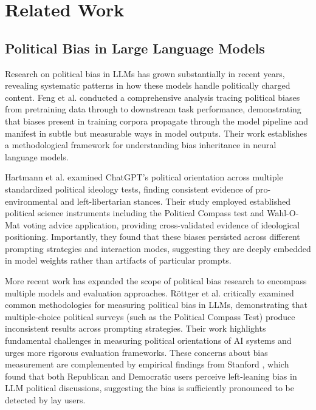 \documentclass[11pt,a4paper]{article}
\begin{document}
\section{Related Work}

\subsection{Political Bias in Large Language Models}

Research on political bias in LLMs has grown substantially in recent years, revealing systematic patterns in how these models handle politically charged content. Feng et al. \citep{feng2023pretraining} conducted a comprehensive analysis tracing political biases from pretraining data through to downstream task performance, demonstrating that biases present in training corpora propagate through the model pipeline and manifest in subtle but measurable ways in model outputs. Their work establishes a methodological framework for understanding bias inheritance in neural language models.

Hartmann et al. \citep{hartmann2023political} examined ChatGPT's political orientation across multiple standardized political ideology tests, finding consistent evidence of pro-environmental and left-libertarian stances. Their study employed established political science instruments including the Political Compass test and Wahl-O-Mat voting advice application, providing cross-validated evidence of ideological positioning. Importantly, they found that these biases persisted across different prompting strategies and interaction modes, suggesting they are deeply embedded in model weights rather than artifacts of particular prompts.

More recent work has expanded the scope of political bias research to encompass multiple models and evaluation approaches. Röttger et al. \citep{rottger2024political} critically examined common methodologies for measuring political bias in LLMs, demonstrating that multiple-choice political surveys (such as the Political Compass Test) produce inconsistent results across prompting strategies. Their work highlights fundamental challenges in measuring political orientations of AI systems and urges more rigorous evaluation frameworks. These concerns about bias measurement are complemented by empirical findings from Stanford \citep{stanford2024partisan}, which found that both Republican and Democratic users perceive left-leaning bias in LLM political discussions, suggesting the bias is sufficiently pronounced to be detected by lay users.
\end{document}
